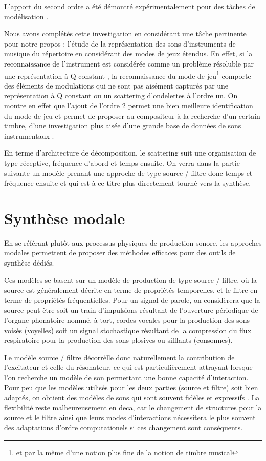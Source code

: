 L'apport du second ordre a été démontré expérimentalement pour des tâches de modélisation \cite{anden2014deep}.

Nous avons complétés cette investigation en considérant une tâche pertinente pour notre propos : l'étude de la représentation des sons d'instruments de musique du répertoire en considérant des modes de jeux étendus. En effet, si la reconnaissance de l'instrument est considérée comme un problème résoluble par une représentation à Q constant \cite{}, la reconnaissance du mode de jeu\footnote{et par la même d'une notion plus fine de la notion de timbre musical} comporte des éléments de modulations qui ne sont pas aisément capturés par une représentation à Q constant ou un scattering d'ondelettes à l'ordre un. On montre en effet que l'ajout de l'ordre 2 permet une bien meilleure identification du mode de jeu et permet de proposer au compositeur à la recherche d'un certain timbre, d'une investigation plus aisée d'une grande base de données de sons instrumentaux \cite{}.

En terme d'architecture de décomposition, le scattering suit une organisation de type réceptive, fréquence d'abord et temps ensuite. On verra dans la partie suivante un modèle prenant une approche de type source / filtre donc temps et fréquence ensuite et qui est à ce titre plus directement tourné vers la synthèse.

\section{ \nmu Synthèse modale}

En se référant plutôt aux processus physiques de production sonore, les approches modales permettent de proposer des méthodes efficaces pour des outils de synthèse dédiés.

Ces modèles se basent sur un modèle de production de type source / filtre, où la source est généralement décrite en terme de propriétés temporelles, et le filtre en terme de propriétés fréquentielles. Pour un signal de parole, on considèrera que la source peut être soit un train d'impulsions résultant de l'ouverture périodique de l'organe phonatoire nommé, à tort,  cordes vocales pour la production des sons voisés (voyelles) soit un signal stochastique résultant de la compression du flux respiratoire pour la production des sons plosives ou sifflants (consonnes).

Le modèle source / filtre décorrèlle donc naturellement la contribution de l'excitateur et celle du résonateur, ce qui est particulièrement attrayant lorsque l'on recherche un modèle de son permettant une bonne capacité d'interaction. Pour peu que les modèles utilisés pour les deux parties (source et filtre) soit bien adaptés, on obtient des modèles de sons qui sont souvent fidèles et expressifs \cite{modalys, marseille}. La flexibilité reste malheureusement en deca, car le changement de structures pour la source et le filtre ainsi que leurs modes d'interactions nécessitera le plus souvent des adaptations d'ordre computationels si ces changement sont conséquents.


